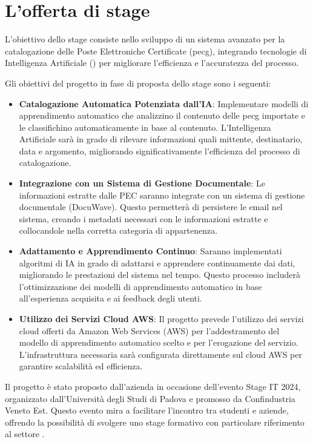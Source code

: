 \section{L'offerta di stage}
L'obiettivo dello stage consiste nello sviluppo di un sistema avanzato per la catalogazione delle Poste Elettroniche Certificate (\gls{pecg}), integrando tecnologie di Intelligenza Artificiale () per migliorare l'efficienza e l'accuratezza del processo.

Gli obiettivi del progetto in fase di proposta dello stage sono i seguenti:

\begin{itemize}
    \item \textbf{Catalogazione Automatica Potenziata dall'IA}: Implementare modelli di apprendimento automatico che analizzino il contenuto delle \gls{pecg} importate e le classifichino automaticamente in base al contenuto. L'Intelligenza Artificiale sarà in grado di rilevare informazioni quali mittente, destinatario, data e argomento, migliorando significativamente l'efficienza del processo di catalogazione.
    
    \item \textbf{Integrazione con un Sistema di Gestione Documentale}: Le informazioni estratte dalle PEC saranno integrate con un sistema di gestione documentale (DocuWave). Questo permetterà di persistere le email nel sistema, creando i metadati necessari con le informazioni estratte e collocandole nella corretta categoria di appartenenza.
    
    \item \textbf{Adattamento e Apprendimento Continuo}: Saranno implementati algoritmi di IA in grado di adattarsi e apprendere continuamente dai dati, migliorando le prestazioni del sistema nel tempo. Questo processo includerà l'ottimizzazione dei modelli di apprendimento automatico in base all'esperienza acquisita e ai feedback degli utenti.
    
    \item \textbf{Utilizzo dei Servizi Cloud AWS}: Il progetto prevede l'utilizzo dei servizi cloud offerti da Amazon Web Services (AWS) per l'addestramento del modello di apprendimento automatico scelto e per l'erogazione del servizio. L'infrastruttura necessaria sarà configurata direttamente sul cloud AWS per garantire scalabilità ed efficienza.
\end{itemize}

Il progetto è stato proposto dall'azienda in occasione dell'evento Stage IT 2024, organizzato dall'Università degli Studi di Padova e promosso da Confindustria Veneto Est. Questo evento mira a facilitare l'incontro tra studenti e aziende, offrendo la possibilità di svolgere uno stage formativo con particolare riferimento al settore .

